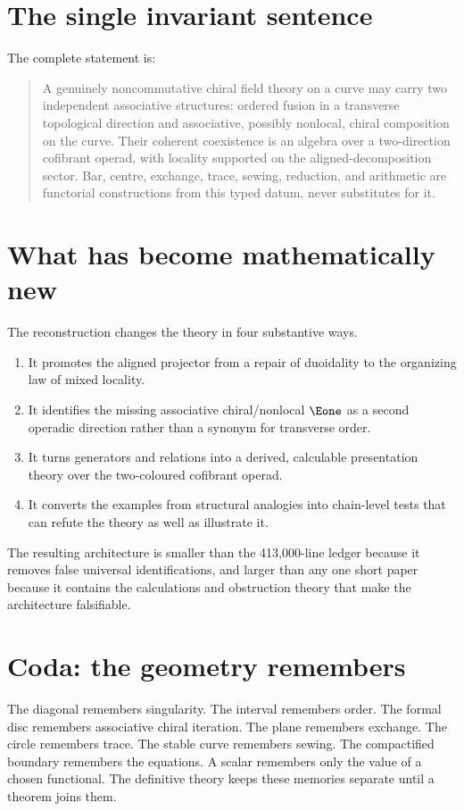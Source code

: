 \section{The single invariant sentence}
The complete statement is:
\begin{quote}
A genuinely noncommutative chiral field theory on a curve may carry two independent associative structures: ordered fusion in a transverse topological direction and associative, possibly nonlocal, chiral composition on the curve.  Their coherent coexistence is an algebra over a two-direction cofibrant operad, with locality supported on the aligned-decomposition sector.  Bar, centre, exchange, trace, sewing, reduction, and arithmetic are functorial constructions from this typed datum, never substitutes for it.
\end{quote}

\section{What has become mathematically new}
The reconstruction changes the theory in four substantive ways.
\begin{enumerate}
\item It promotes the aligned projector from a repair of duoidality to the organizing law of mixed locality.
\item It identifies the missing associative chiral/nonlocal \(\Eone\) as a second operadic direction rather than a synonym for transverse order.
\item It turns generators and relations into a derived, calculable presentation theory over the two-coloured cofibrant operad.
\item It converts the examples from structural analogies into chain-level tests that can refute the theory as well as illustrate it.
\end{enumerate}
The resulting architecture is smaller than the 413,000-line ledger because it removes false universal identifications, and larger than any one short paper because it contains the calculations and obstruction theory that make the architecture falsifiable.

\section{Coda: the geometry remembers}
The diagonal remembers singularity.  The interval remembers order.  The formal disc remembers associative chiral iteration.  The plane remembers exchange.  The circle remembers trace.  The stable curve remembers sewing.  The compactified boundary remembers the equations.  A scalar remembers only the value of a chosen functional.  The definitive theory keeps these memories separate until a theorem joins them.
